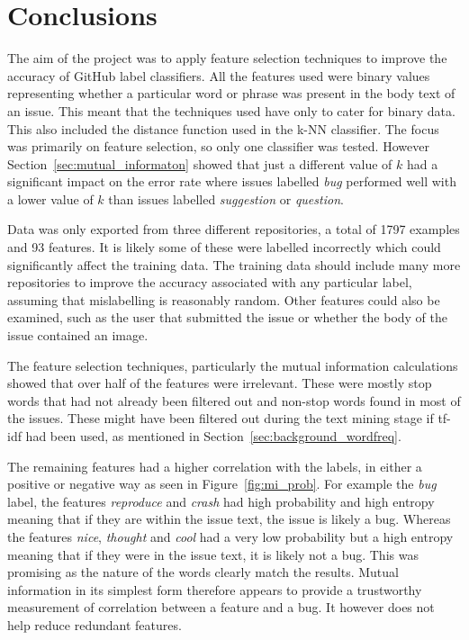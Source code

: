 \section{Conclusions}
The aim of the project was to apply feature selection techniques to improve the accuracy of GitHub label classifiers. All the
features used were binary values representing whether a particular word or phrase was present in the body text of an issue. This
meant that the techniques used have only to cater for binary data. This also included the distance function used in the k-NN
classifier. The focus was primarily on feature selection, so only one classifier was tested. However
Section~\ref{sec:mutual_informaton} showed that just a different value of $k$ had a significant impact on the error rate where
issues labelled \textit{bug} performed well with a lower value of $k$ than issues labelled \textit{suggestion} or
\textit{question}.

Data was only exported from three different repositories, a total of 1797 examples and 93 features. It is likely some of these
were labelled incorrectly which could significantly affect the training data. The training data should include many more
repositories to improve the accuracy associated with any particular label, assuming that mislabelling is reasonably random.
Other features could also be examined, such as the user that submitted the issue or whether the body of the issue contained an
image.

The feature selection techniques, particularly the mutual information calculations showed that over half of the features were
irrelevant. These were mostly stop words that had not already been filtered out and non-stop words found in most of the issues.
These might have been filtered out during the text mining stage if tf-idf had been used, as mentioned in
Section~\ref{sec:background_wordfreq}.

The remaining features had a higher correlation with the labels, in either a positive or negative way as seen in
Figure~\ref{fig:mi_prob}. For example the \textit{bug} label, the features \textit{reproduce} and \textit{crash} had high
probability and high entropy meaning that if they are within the issue text, the issue is likely a bug. Whereas the features
\textit{nice}, \textit{thought} and \textit{cool} had a very low probability but a high entropy meaning that if they were in the
issue text, it is likely not a bug. This was promising as the nature of the words clearly match the results. Mutual information
in its simplest form therefore appears to provide a trustworthy measurement of correlation between a feature and a bug. It
however does not help reduce redundant features.

